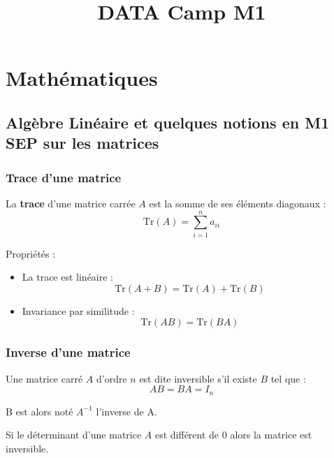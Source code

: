 \documentclass[
  letterpaper,
  DIV=11,
  numbers=noendperiod]{scrartcl}
\title{DATA Camp M1}
\author{}
\date{}
\providecommand{\tightlist}{%
  \setlength{\itemsep}{0pt}\setlength{\parskip}{0pt}}\usepackage{longtable,booktabs,array}
\begin{document}
\maketitle


\section{Mathématiques}\label{mathuxe9matiques}

\subsection{Algèbre Linéaire et quelques notions en M1 SEP sur les
matrices}\label{alguxe8bre-linuxe9aire-et-quelques-notions-en-m1-sep-sur-les-matrices}

\subsubsection{Trace d'une matrice}\label{trace-dune-matrice}

La \textbf{trace} d'une matrice carrée \(A\) est la somme de ses
éléments diagonaux : \[\text{Tr}(A) = \sum_{i=1}^{n} a_{ii}\]

Propriétés :

\begin{itemize}
\tightlist
\item
  La trace est linéaire :
  \[\text{Tr}(A + B) = \text{Tr}(A) + \text{Tr}(B)\]
\item
  Invariance par similitude : \[\text{Tr}(AB) = \text{Tr}(BA)\]
\end{itemize}

\subsubsection{Inverse d'une matrice}\label{inverse-dune-matrice}

Une matrice carré \(A\) d'ordre \(n\) est dite inversible s'il existe
\(B\) tel que : \[AB = BA = I_n\]

B est alors noté \(A^{-1}\) l'inverse de A.

\begin{tcolorbox}[enhanced jigsaw, opacityback=0, toptitle=1mm, bottomtitle=1mm, rightrule=.15mm, colframe=quarto-callout-tip-color-frame, leftrule=.75mm, titlerule=0mm, breakable, bottomrule=.15mm, colbacktitle=quarto-callout-tip-color!10!white, coltitle=black, arc=.35mm, left=2mm, colback=white, toprule=.15mm, title=\textcolor{quarto-callout-tip-color}{\faLightbulb}\hspace{0.5em}{Tip}, opacitybacktitle=0.6]

Si le déterminant d'une matrice \(A\) est différent de 0 alors la
matrice est inversible.

\end{tcolorbox}
\end{document}
